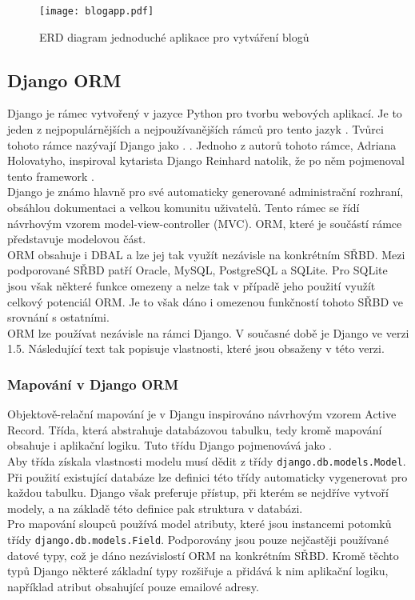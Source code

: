 \documentclass[ing,male,java,dept456]{diploma}						%
\begin{document}
\begin{figure}[h!]
    \centering
    \texttt{[image: blogapp.pdf]}
    \caption{ERD diagram jednoduché aplikace pro vytváření blogů}
    \label{fig:BlogappErd}
\end{figure}
\clearpage

\subsection{Django ORM}

Django je rámec vytvořený v jazyce Python pro tvorbu webových aplikací. Je to jeden z nejpopulárnějších a nejpoužívanějších rámců pro tento jazyk \cite{pwiki}. Tvůrci tohoto rámce nazývají Django jako .  \cite{django.cz}. Jednoho z autorů tohoto rámce, Adriana Holovatyho, inspiroval kytarista Django Reinhard natolik, že po něm pojmenoval tento framework \cite{aholovaty}.  \\

Django je známo hlavně pro své automaticky generované administrační rozhraní, obsáhlou dokumentaci a velkou komunitu uživatelů. Tento rámec se řídí návrhovým vzorem model-view-controller (MVC). ORM, které je součástí rámce představuje modelovou část. \\ 
ORM obsahuje i DBAL a lze jej tak využít nezávisle na konkrétním SŘBD. Mezi podporované SŘBD patří Oracle, MySQL, PostgreSQL a SQLite. Pro SQLite jsou však některé funkce omezeny a nelze tak v případě jeho použití využít celkový potenciál ORM. Je to však dáno i omezenou funkčností tohoto SŘBD ve srovnání s ostatními. \\
ORM lze používat nezávisle na rámci Django. V současné době je Django ve verzi 1.5. Následující text tak popisuje vlastnosti, které jsou obsaženy v této verzi.

\subsubsection{Mapování v Django ORM}

Objektově-relační mapování je v Djangu inspirováno návrhovým vzorem Active Record. Třída, která abstrahuje databázovou tabulku, tedy kromě mapování obsahuje i aplikační logiku. Tuto třídu Django pojmenovává jako . \\
Aby třída získala vlastnosti modelu musí dědit z třídy \lstinline[style=custompython]|django.db.models.Model|. Při použití existující databáze lze definici této třídy automaticky vygenerovat pro každou tabulku. Django však preferuje přístup, při kterém se nejdříve vytvoří modely, a na základě této definice pak struktura v databázi. \\
Pro mapování sloupců používá model atributy, které jsou instancemi potomků třídy \lstinline[style=custompython]|django.db.models.Field|. Podporovány jsou pouze nejčastěji používané datové typy, což je dáno nezávislostí ORM na konkrétním SŘBD. Kromě těchto typů Django některé základní typy rozšiřuje a přidává k nim aplikační logiku, například atribut obsahující pouze emailové adresy. \\
\end{document}
